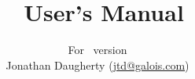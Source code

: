 \title{\vtyui\ User's Manual}
\author{
  For \vtyui\ version \vtyuiversion\\
  Jonathan Daugherty (\href{mailto:jtd@galois.com}{jtd@galois.com})
}
\maketitle
